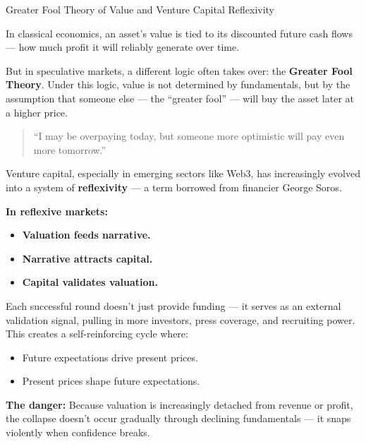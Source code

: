 \begin{HistoricalSidebar}{Greater Fool Theory of Value and Venture Capital Reflexivity}

    In classical economics, an asset’s value is tied to its discounted future cash flows --- how much profit it will reliably generate over time.
    
    \medskip
    
    But in speculative markets, a different logic often takes over: the \textbf{Greater Fool Theory}.  
    Under this logic, value is not determined by fundamentals, but by the assumption that someone else --- the ``greater fool'' --- will buy the asset later at a higher price.
    
    \begin{quote}
    ``I may be overpaying today, but someone more optimistic will pay even more tomorrow.''
    \end{quote}
    
    \medskip
    
    Venture capital, especially in emerging sectors like Web3, has increasingly evolved into a system of \textbf{reflexivity} --- a term borrowed from financier George Soros.
    
    \medskip
    
    \textbf{In reflexive markets:}
    
    \begin{itemize}
        \item \textbf{Valuation feeds narrative.}
        \item \textbf{Narrative attracts capital.}
        \item \textbf{Capital validates valuation.}
    \end{itemize}
    
    \medskip
    
    Each successful round doesn’t just provide funding --- it serves as an external validation signal, pulling in more investors, press coverage, and recruiting power. This creates a self-reinforcing cycle where:
    
    \begin{itemize}
        \item Future expectations drive present prices.
        \item Present prices shape future expectations.
    \end{itemize}
    
    \medskip
    
    \textbf{The danger:}  
    Because valuation is increasingly detached from revenue or profit, the collapse doesn’t occur gradually through declining fundamentals --- it snaps violently when confidence breaks.
    

\end{HistoricalSidebar}
